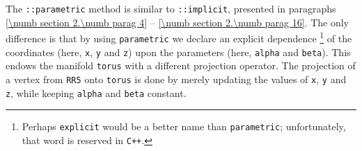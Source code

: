 The {\small\tt{}::parametric} method is similar to {\small\tt{}::implicit},
presented in paragraphs \ref{\numb section 2.\numb parag 4} --
\ref{\numb section 2.\numb parag 16}.
The only difference is that by using {\small\tt parametric} we declare an explicit dependence%
\footnote {Perhaps {\small\tt explicit} would be a better name than {\small\tt parametric};
unfortunately, that word is reserved in {\small\tt C++}.}
of the coordinates (here, {\small\tt x}, {\small\tt y} and {\small\tt z}) upon the parameters
(here, {\small\tt alpha} and {\small\tt beta}).
This endows the manifold {\small\tt torus} with a different projection operator.
The projection of a vertex from {\small\tt RR5} onto {\small\tt torus} is done by merely updating
the values of {\small\tt x}, {\small\tt y} and {\small\tt z}, while keeping {\small\tt alpha} and
{\small\tt beta} constant.
